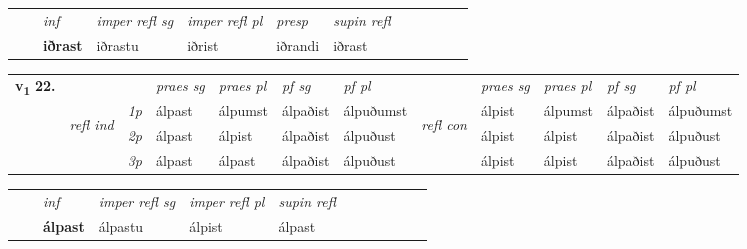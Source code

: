 \begin{tabular}{llllllllllll}
 & & \textit{inf}   & \textit{imper refl sg} & \textit{imper refl pl} & \textit{presp}  & \textit{supin refl}      \\*
  & & \textbf{iðrast}    & iðrastu & iðrist & iðrandi  & iðrast  \\*
\cmidrule{1-12}
\end{tabular}



\begin{tabular}{llllllllllll} \toprule
\multirow{4}{*}{{{\textbf{v{\textsubscript{1}}} \Large{\textbf{22.}}}}}  & &   &  \textit{praes sg}  & \textit{praes pl}  &\textit{pf sg} & \textit{pf pl} &  &  \textit{praes sg}  & \textit{praes pl}  & \textit{pf sg} & \textit{pf pl } \\*
	\cmidrule{4-7} \cmidrule{9-12}
 &\multirow{3}{*}{\begin{turn}{90}\textit{refl ind}\end{turn}} & {\textit{1p}} & álpast & álpumst    & álpaðist & álpuðumst & \multirow{3}{*}{\begin{turn}{90}\textit{refl con}\end{turn}}  &álpist & álpumst & álpaðist & álpuðumst\\*
 &&  {\textit{2p}} &  álpast  & álpist   & álpaðist & álpuðust & &álpist & álpist & álpaðist & álpuðust \\*
& &  {\textit{3p}} & álpast & álpast   & álpaðist & álpuðust & & álpist & álpist& álpaðist & álpuðust  \\*
\cmidrule{4-7} \cmidrule{9-12}
\end{tabular}


\begin{tabular}{llllllllllll}
 & & \textit{inf}   & \textit{imper refl sg} & \textit{imper refl pl}   & \textit{supin refl}      \\*
  & & \textbf{álpast}    & álpastu & álpist   & álpast  \\*
\cmidrule{1-12}
\end{tabular}



